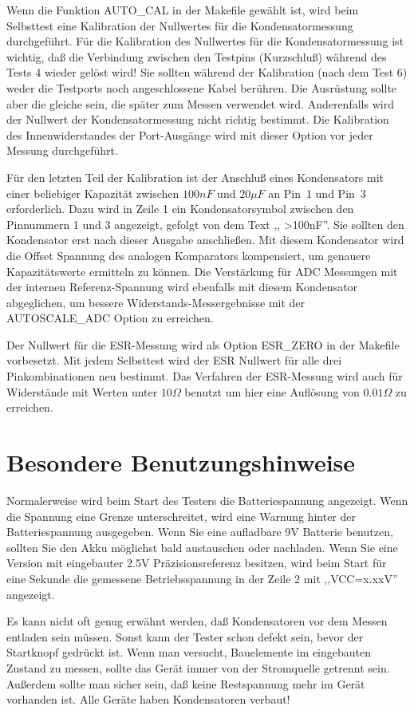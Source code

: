 Wenn die Funktion AUTO\_CAL in der Makefile gewählt ist, wird beim Selbsttest
eine Kalibration der Nullwertes für die Kondensatormessung durchgeführt.
Für die Kalibration des Nullwertes für die Kondensatormessung ist wichtig, 
daß die Verbindung zwischen den Testpins (Kurzschluß) während des Tests 4 wieder gelöst wird!
Sie sollten während der Kalibration (nach dem Test 6) weder die Testports noch angeschlossene Kabel berühren.
Die Ausrüstung sollte aber die gleiche sein, die später zum Messen verwendet wird.
Anderenfalls wird der Nullwert der Kondensatormessung nicht richtig bestimmt.
Die Kalibration des Innenwiderstandes der Port-Ausgänge wird mit dieser Option vor jeder
Messung durchgeführt.

Für den letzten Teil der Kalibration ist der Anschluß eines Kondensators 
mit einer beliebiger Kapazität zwischen \(100 nF\) und \(20 \mu F\) an Pin~1 und Pin~3 erforderlich.
Dazu wird in Zeile 1 ein Kondensatorsymbol zwischen den Pinnummern 1 und 3 angezeigt, gefolgt von dem Text ,, >100nF''.
Sie sollten den Kondensator erst nach dieser Ausgabe anschließen.
Mit diesem Kondensator wird die Offset Spannung des analogen Komparators kompensiert,
um genauere Kapazitätswerte ermitteln zu können.
Die Verstärkung für ADC Messungen mit der internen Referenz-Spannung wird ebenfalls mit diesem Kondensator abgeglichen, um
bessere Widerstands-Messergebnisse mit der AUTOSCALE\_ADC Option zu erreichen.

Der Nullwert für die ESR-Messung wird als Option ESR\_ZERO in der Makefile vorbesetzt.
Mit jedem Selbsttest wird der ESR Nullwert für alle drei Pinkombinationen neu bestimmt.
Das Verfahren der ESR-Messung wird auch für Widerstände mit Werten unter \(10 \Omega\) benutzt um
hier eine Auflösung von \(0.01 \Omega\) zu erreichen.

\section{Besondere Benutzungshinweise}
Normalerweise wird beim Start des Testers die Batteriespannung angezeigt. Wenn die Spannung eine Grenze unterschreitet, 
wird eine Warnung hinter der Batteriespannung ausgegeben. Wenn Sie eine aufladbare 9V Batterie benutzen, sollten Sie
den Akku möglichst bald austauschen oder nachladen.
Wenn Sie eine Version mit eingebauter 2.5V Präzisionsreferenz besitzen, wird beim Start für eine Sekunde die
gemessene Betriebsspannung in der Zeile 2 mit ,,VCC=x.xxV'' angezeigt.

Es kann nicht oft genug erwähnt werden, daß Kondensatoren vor dem Messen entladen sein müssen.
Sonst kann der Tester schon defekt sein, bevor der Startknopf gedrückt ist.
Wenn man versucht, Bauelemente im eingebauten Zustand zu messen, sollte das Gerät immer von
der Stromquelle getrennt sein. Außerdem sollte man sicher sein, daß keine Restspannung mehr
im Gerät vorhanden ist. Alle Geräte haben Kondensatoren verbaut!

